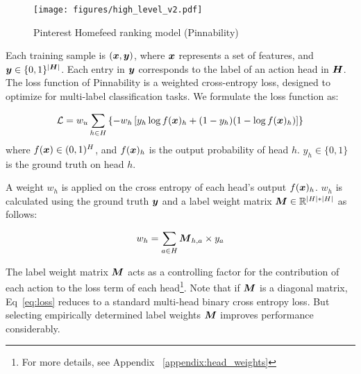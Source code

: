 

\begin{figure}[h]
  \centering
  \texttt{[image: figures/high\_level\_v2.pdf]}
  \caption{Pinterest Homefeed ranking model (Pinnability)}
  \label{fig:pinnability}
\end{figure}

Each training sample is $(\boldsymbol{x}, \boldsymbol{y})$, where $\boldsymbol{x}$ represents a set of features, and $\boldsymbol{y} \in \{0,1\} ^{|\boldsymbol{H}|}$. Each entry in $\boldsymbol{y}$ corresponds to the label of an action head in $\boldsymbol{H}$.
The loss function of Pinnability is a weighted cross-entropy loss, designed to optimize for multi-label classification tasks.
We formulate the loss function as:

\begin{equation}
\label{eq:loss}
\mathcal{L} = w_u \sum_{h \in H } \left\{ - w_h\left[y_h \log f(\boldsymbol{x})_h + (1-y_h)(1 - \log f(\boldsymbol{x})_h) \right] \right\}
\end{equation}
where $f(\boldsymbol{x})\in (0, 1)^H$, and $f(\boldsymbol{x})_h$ is the output probability of head $h$. $y_h \in \{0,1\}$ is the ground truth on head $h$.

A weight $w_h$ is applied on the cross entropy of each head's output $f(\boldsymbol{x})_h$.
$w_h$ is calculated using the ground truth $\boldsymbol{y}$ and a label weight matrix  $\boldsymbol{M} \in \mathbb{R} ^{|H| * |H|}$ as follows:


\begin{equation}
w_h = \sum_{a \in H }\boldsymbol{M}_{h,a} \times y_a
\end{equation}



The label weight matrix $\boldsymbol{M}$ acts as a controlling factor for the contribution of each action to the loss term of each head\footnote{For more details, see Appendix ~\ref{appendix:head_weights}}.
Note that if $\boldsymbol{M}$ is a diagonal matrix, Eq~\eqref{eq:loss} reduces to a standard multi-head binary cross entropy loss.
But selecting empirically determined label weights $\boldsymbol{M}$ improves performance considerably.


